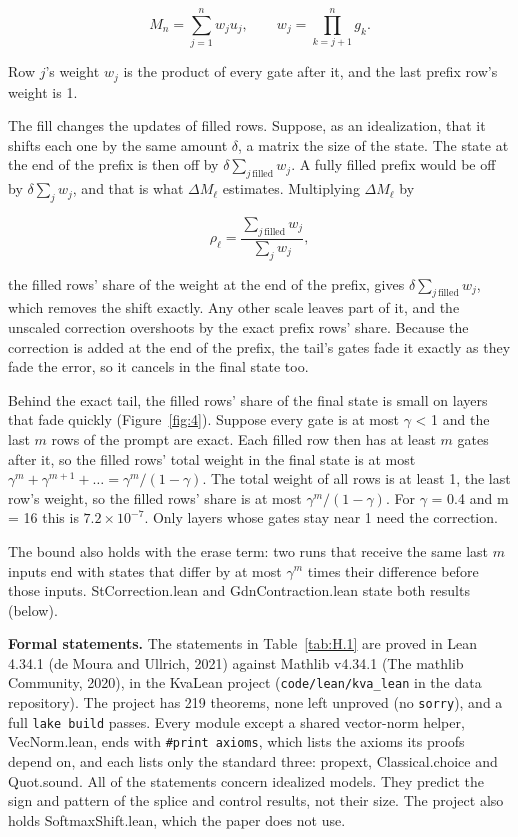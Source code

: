 \documentclass[11pt]{article}
\begin{document}
\[M_n = \sum_{j=1}^{n} w_j u_j, \qquad w_j = \prod_{k=j+1}^{n} g_k .\]

Row $j$'s weight $w_j$ is the product of every gate after it, and the last prefix row's weight is 1.

The fill changes the updates of filled rows. Suppose, as an idealization, that it shifts each one by the same amount $\delta$, a matrix the size of the state. The state at the end of the prefix is then off by $\delta \sum_{j\,\text{filled}} w_j$. A fully filled prefix would be off by $\delta \sum_j w_j$, and that is what $\Delta M_\ell$ estimates. Multiplying $\Delta M_\ell$ by

\[\rho_\ell = \frac{\sum_{j\,\text{filled}} w_j}{\sum_j w_j},\]

the filled rows' share of the weight at the end of the prefix, gives $\delta \sum_{j\,\text{filled}} w_j$, which removes the shift exactly. Any other scale leaves part of it, and the unscaled correction overshoots by the exact prefix rows' share. Because the correction is added at the end of the prefix, the tail's gates fade it exactly as they fade the error, so it cancels in the final state too.

Behind the exact tail, the filled rows' share of the final state is small on layers that fade quickly (Figure~\ref{fig:4}). Suppose every gate is at most $\gamma$ \textless{} 1 and the last $m$ rows of the prompt are exact. Each filled row then has at least $m$ gates after it, so the filled rows' total weight in the final state is at most $\gamma^m + \gamma^{m+1} + \dots = \gamma^m/(1-\gamma)$. The total weight of all rows is at least 1, the last row's weight, so the filled rows' share is at most $\gamma^m/(1-\gamma)$. For $\gamma$ = 0.4 and m = 16 this is $7.2 \times 10^{-7}$. Only layers whose gates stay near 1 need the correction.

The bound also holds with the erase term: two runs that receive the same last $m$ inputs end with states that differ by at most $\gamma^m$ times their difference before those inputs. StCorrection.lean and GdnContraction.lean state both results (below).

\textbf{Formal statements.} The statements in Table~\ref{tab:H.1} are proved in Lean 4.34.1 (de Moura and Ullrich, 2021) against Mathlib v4.34.1 (The mathlib Community, 2020), in the KvaLean project (\texttt{code/\allowbreak{}lean/\allowbreak{}kva\_\allowbreak{}lean} in the data repository). The project has 219 theorems, none left unproved (no \texttt{sorry}), and a full \texttt{lake build} passes. Every module except a shared vector-norm helper, VecNorm.lean, ends with \texttt{\#print axioms}, which lists the axioms its proofs depend on, and each lists only the standard three: propext, Classical.choice and Quot.sound. All of the statements concern idealized models. They predict the sign and pattern of the splice and control results, not their size. The project also holds SoftmaxShift.lean, which the paper does not use.
\end{document}
